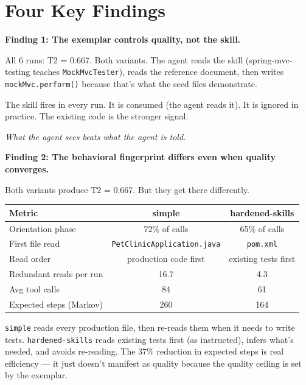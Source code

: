 \documentclass[11pt,a4paper]{article}
\begin{document}
\section{Four Key Findings}

\begin{findingbox}
\textbf{Finding 1: The exemplar controls quality, not the skill.}

All 6 runs: T2 = 0.667. Both variants. The agent reads the skill
(spring-mvc-testing teaches \texttt{MockMvcTester}), reads the reference document,
then writes \texttt{mockMvc.perform()} because that's what the seed files demonstrate.

The skill fires in every run. It is consumed (the agent reads it).
It is ignored in practice. The existing code is the stronger signal.

\emph{What the agent sees beats what the agent is told.}
\end{findingbox}

\begin{findingbox}
\textbf{Finding 2: The behavioral fingerprint differs even when quality converges.}

Both variants produce T2 = 0.667. But they get there differently.

\begin{center}
\begin{tabular}{@{}lcc@{}}
\toprule
\textbf{Metric} & \textbf{simple} & \textbf{hardened-skills} \\
\midrule
Orientation phase          & 72\% of calls  & 65\% of calls \\
First file read            & \texttt{PetClinicApplication.java} & \texttt{pom.xml} \\
Read order                 & production code first & existing tests first \\
Redundant reads per run    & 16.7 & 4.3 \\
Avg tool calls             & 84   & 61 \\
Expected steps (Markov)    & 260  & 164 \\
\bottomrule
\end{tabular}
\end{center}

\texttt{simple} reads every production file, then re-reads them when it needs
to write tests. \texttt{hardened-skills} reads existing tests first (as instructed),
infers what's needed, and avoids re-reading. The 37\% reduction in expected steps
is real efficiency --- it just doesn't manifest as quality because the quality
ceiling is set by the exemplar.
\end{findingbox}
\end{document}
